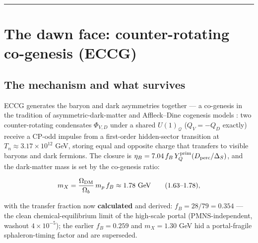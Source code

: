 \documentclass[submission, Phys]{SciPost}
\begin{document}
\begin{center}\rule{0.5\linewidth}{0.5pt}\end{center}

\section{The dawn face: counter-rotating co-genesis (ECCG)}\label{sec-3}

\subsection{The mechanism and what survives}\label{sec-3-1}

ECCG generates the baryon and dark asymmetries together --- a co-genesis
in the tradition of asymmetric-dark-matter and Affleck--Dine cogenesis
models \cite{Shelton:2010ta, Cheung:2011if}: two counter-rotating
condensates \(\Phi_{V,D}\) under a shared \(U(1)_{\mathcal Q}\)
(\(Q_V = -Q_D\) exactly) receive a CP-odd impulse from a first-order
hidden-sector transition at \(T_n \approx 3.17\times 10^{12}\) GeV,
storing equal and opposite charge that transfers to visible baryons and
dark fermions. The closure is
\(\eta_B = 7.04\, f_B\, Y_Q^{\rm prim} (D_{\rm perc}/\Delta_S)\), and
the dark-matter mass is set by the co-genesis ratio:

\begin{equation}
m_X = \frac{\Omega_{\rm DM}}{\Omega_b}\, m_p\, f_B \approx 1.78\ \mathrm{GeV}
\qquad (1.63\text{–}1.78),
\end{equation}

with the transfer fraction now \textbf{calculated} and derived:
\(f_B = 28/79 = 0.354\) --- the clean chemical-equilibrium limit of the
high-scale portal (PMNS-independent, washout \(4\times 10^{-5}\)); the
earlier \(f_B = 0.259\) and \(m_X = 1.30\) GeV hid a portal-fragile
sphaleron-timing factor and are superseded.
\end{document}
